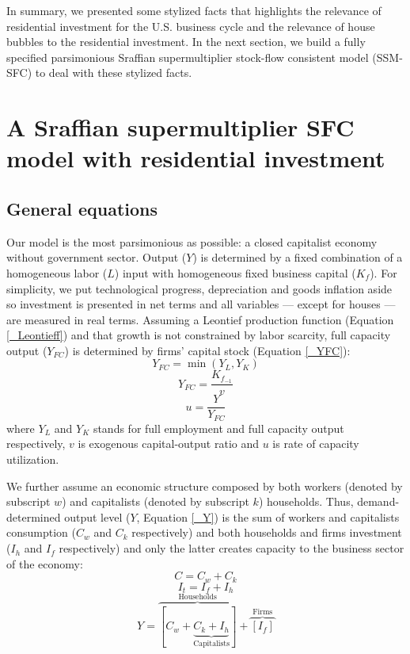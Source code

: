 \documentclass[11pt]{article}
\begin{document}
In summary, we presented some stylized facts that highlights the relevance of residential investment for the U.S. business cycle and the relevance of house bubbles to the residential investment.
In the next section, we build a fully specified parsimonious Sraffian supermultiplier stock-flow consistent model (SSM-SFC) to deal with these stylized facts.


\section{A Sraffian supermultiplier SFC model with residential investment}
\label{sec:org3116345}
\label{sec:Model}
\subsection{General equations}
\label{sec:org983c5e5}

Our model is the most parsimonious as possible: a closed capitalist economy without government sector. Output (\(Y\)) is determined by  a fixed combination of a homogeneous labor (\(L\)) input with homogeneous fixed business capital (\(K_f\)). 
For simplicity, we put technological progress, depreciation and goods inflation aside so investment is presented in net terms and all variables --- except for houses --- are measured in real terms.
Assuming a Leontief production function (Equation \ref{_Leontieff}) and that growth is not constrained by labor scarcity, full capacity output (\(Y_{FC}\)) is
determined by firms' capital stock (Equation \ref{_YFC}):
\begin{equation}
\label{_Leontieff}
    Y_{FC} = \min (Y_L, Y_K)
\end{equation}
\begin{equation}
\label{_YFC}
    Y_{FC} = \frac{K_{f_{-1}}}{v}
\end{equation}
\begin{equation}
\label{_u}
    u = \frac{Y}{Y_{FC}}
\end{equation}
where \(Y_L\) and \(Y_K\) stands for full employment and full capacity output respectively, \(v\) is exogenous capital-output ratio and \(u\) is rate of capacity utilization.

We further assume an economic structure composed by both workers (denoted by subscript \(w\)) and capitalists (denoted by subscript \(k\)) households.
Thus, demand-determined output level (\(Y\), Equation \ref{_Y})  is the sum of workers and capitalists consumption (\(C_w\) and \(C_k\) respectively) and both households and firms investment (\(I_h\) and \(I_f\) respectively) and only the latter creates capacity to the business sector of the economy:
\begin{equation}
\label{_Ct}
    C = C_w + C_k
\end{equation}
\begin{equation}
\label{_It}
    I_t = I_f + I_h
\end{equation}
\begin{equation}
\label{_Y}
    Y = \overbrace{[C_w + \underbrace{C_k + I_h}_{\text{Capitalists}}]}^{\text{Households}} + \overbrace{[I_f]}^{\text{Firms}}
\end{equation}
\end{document}
